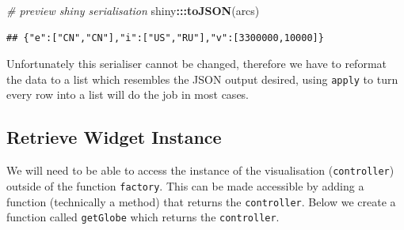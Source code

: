 \documentclass[
]{krantz}
\makeatletter
\newenvironment{Shaded}{\begin{snugshade}}{\end{snugshade}}
\newcommand{\CommentTok}[1]{\textcolor[rgb]{0.37,0.37,0.37}{\textit{#1}}}
\newcommand{\ControlFlowTok}[1]{\textcolor[rgb]{0.27,0.27,0.27}{\textbf{#1}}}
\newcommand{\DataTypeTok}[1]{\textcolor[rgb]{0.27,0.27,0.27}{#1}}
\newcommand{\DecValTok}[1]{\textcolor[rgb]{0.06,0.06,0.06}{#1}}
\newcommand{\KeywordTok}[1]{\textcolor[rgb]{0.27,0.27,0.27}{\textbf{#1}}}
\newcommand{\NormalTok}[1]{#1}
\newcommand{\OperatorTok}[1]{\textcolor[rgb]{0.43,0.43,0.43}{\textbf{#1}}}
\newcommand{\StringTok}[1]{\textcolor[rgb]{0.5,0.5,0.5}{#1}}
\newenvironment{kframe}{%
\medskip{}
\setlength{\fboxsep}{.8em}
 \def\at@end@of@kframe{}%
 \ifinner\ifhmode%
  \def\at@end@of@kframe{\end{minipage}}%
  \begin{minipage}{\columnwidth}%
 \fi\fi%
 \def\FrameCommand##1{\hskip\@totalleftmargin \hskip-\fboxsep
 \colorbox{shadecolor}{##1}\hskip-\fboxsep
     \hskip-\linewidth \hskip-\@totalleftmargin \hskip\columnwidth}%
 \MakeFramed {\advance\hsize-\width
   \@totalleftmargin\z@ \linewidth\hsize
   \@setminipage}}%
 {\par\unskip\endMakeFramed%
 \at@end@of@kframe}
\renewenvironment{Shaded}{\begin{kframe}}{\end{kframe}}
\makeatother
\begin{document}
\begin{Shaded}
\begin{Highlighting}[]
\CommentTok{\# preview shiny serialisation}
\NormalTok{shiny}\OperatorTok{:::}\KeywordTok{toJSON}\NormalTok{(arcs)}
\end{Highlighting}
\end{Shaded}

\begin{verbatim}
## {"e":["CN","CN"],"i":["US","RU"],"v":[3300000,10000]}
\end{verbatim}

Unfortunately this serialiser cannot be changed, therefore we have to reformat the data to a list which resembles the JSON output desired, using \texttt{apply} to turn every row into a list will do the job in most cases.

\begin{Shaded}
\end{Shaded}

\hypertarget{retrieve-widget-instance}{%
\subsection{Retrieve Widget Instance}\label{retrieve-widget-instance}}

We will need to be able to access the instance of the visualisation (\texttt{controller}) outside of the function \texttt{factory}. This can be made accessible by adding a function (technically a method) that returns the \texttt{controller}. Below we create a function called \texttt{getGlobe} which returns the \texttt{controller}.
\end{document}
